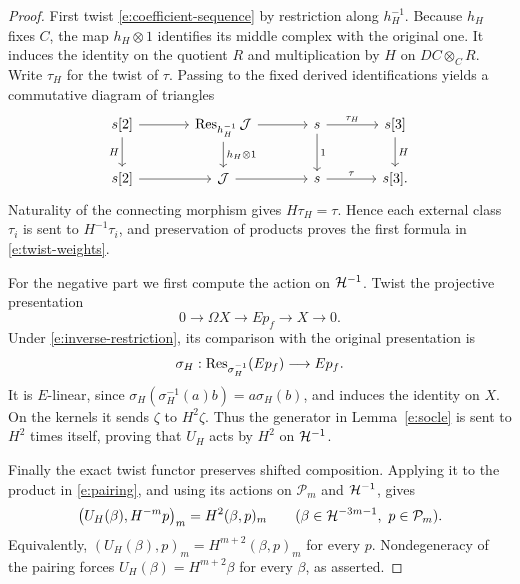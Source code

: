 \begin{proof}
First twist \eqref{e:coefficient-sequence} by restriction along
\(h_H^{-1}\).  Because \(h_H\) fixes \(C\), the map
\(h_H\otimes1\) identifies its middle complex with the original
one.  It induces the identity on the quotient \(R\) and multiplication
by \(H\) on \(DC\otimes_C R\).  Write \(\tau_H\) for the twist of
\(\tau\).  Passing to the fixed derived identifications yields a
commutative diagram of triangles
\[
\begin{tikzcd}[column sep=large]
s[2]\arrow[r]\arrow[d,"H"']&
\Res_{h_H^{-1}}\mathcal J\arrow[r]
 \arrow[d,"h_H\otimes1"]&
s\arrow[r,"\tau_H"]\arrow[d,"1"]&
s[3]\arrow[d,"H"]\\
s[2]\arrow[r]&\mathcal J\arrow[r]&s\arrow[r,"\tau"]&s[3].
\end{tikzcd}
\]
Naturality of the connecting morphism gives \(H\tau_H=\tau\).
Hence each external class \(\tau_i\) is sent to
\(H^{-1}\tau_i\), and preservation of products proves the first
formula in \eqref{e:twist-weights}.

For the negative part we first compute the action on \(\mathcal H^{-1}\).
Twist the projective presentation
\[
0\longrightarrow\Omega X\longrightarrow Ep_f
 \longrightarrow X\longrightarrow0.
\]
Under \eqref{e:inverse-restriction}, its comparison with the original
presentation is
\[
\sigma_H:\operatorname{Res}_{\sigma_H^{-1}}(Ep_f)\longrightarrow Ep_f.
\]
It is \(E\)-linear, since
\(\sigma_H(\sigma_H^{-1}(a)b)=a\sigma_H(b)\), and induces the
identity on \(X\).  On the kernels it sends
\(\zeta\) to \(H^2\zeta\).  Thus the generator in
Lemma~\ref{e:socle} is sent to \(H^2\) times itself, proving that
\(U_H\) acts by \(H^2\) on \(\mathcal H^{-1}\).

Finally the exact twist functor preserves shifted composition.
Applying it to the product in \eqref{e:pairing}, and using its actions
on \(\mathcal P_m\) and \(\mathcal H^{-1}\), gives
\[
\bigl(U_H(\beta),H^{-m}p\bigr)_m
 =H^2(\beta,p)_m
\qquad
(\beta\in\mathcal H^{-3m-1},\ p\in\mathcal P_m).
\]
Equivalently,
\((U_H(\beta),p)_m=H^{m+2}(\beta,p)_m\) for every \(p\).
Nondegeneracy of the pairing forces
\(U_H(\beta)=H^{m+2}\beta\) for every \(\beta\), as asserted.
\end{proof}
